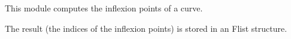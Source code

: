 This module computes the inflexion points of a curve.

\medskip
The result (the indices of the inflexion points) is stored in an 
Flist structure.